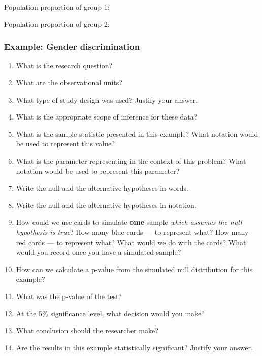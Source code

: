 \documentclass[
]{report}
\newcommand{\rgs}{\vspace{12pt}} %
\begin{document}
Population proportion of group 1:
\rgs

Population proportion of group 2:
\rgs

\hypertarget{example-gender-discrimination}{%
\subsubsection*{Example: Gender discrimination}\label{example-gender-discrimination}}

\begin{enumerate}
\def\labelenumi{\arabic{enumi}.}
\item
  What is the research question?
  \rgs
\item
  What are the observational units?
  \rgs
\item
  What type of study design was used? Justify your answer.
  \rgs
\item
  What is the appropriate scope of inference for these data?
  \rgs
\item
  What is the sample statistic presented in this example? What notation would be used to represent this value?
  \rgs
\item
  What is the parameter representing in the context of this problem? What notation would be used to represent this parameter?
  \rgs
  \rgs
\item
  Write the null and the alternative hypotheses in words.
  \rgs
  \rgs
\item
  Write the null and the alternative hypotheses in notation.
  \rgs
\item
  How could we use cards to simulate \textbf{ome} sample \emph{which assumes the null hypothesis is true}? How many blue cards --- to represent what? How many red cards --- to represent what? What would we do with the cards? What would you record once you have a simulated sample?
  \rgs
  \rgs
  \rgs
\item
  How can we calculate a p-value from the simulated null distribution for this example?
  \rgs
  \rgs
\item
  What was the p-value of the test?
  \rgs
\item
  At the 5\% significance level, what decision would you make?
  \rgs
\item
  What conclusion should the researcher make?
  \rgs
  \rgs
\item
  Are the results in this example statistically significant? Justify your answer.
  \rgs
\end{enumerate}
\end{document}
